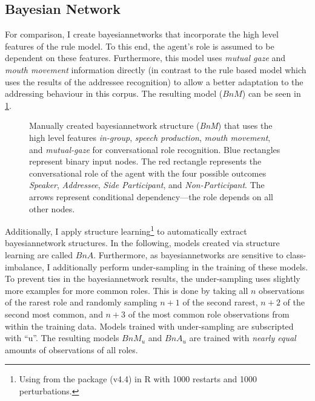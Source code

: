 \subsection{Bayesian Network}\label{sec:role-rule-bn}

For comparison, I create \glspl{bayesiannetwork} that incorporate the high level features of the rule model.
To this end, the agent's role is assumed to be dependent on these features.
Furthermore, this model uses \emph{mutual gaze} and \emph{mouth movement} information directly (in contrast to the rule based model which uses the results of the \gls{addressee} recognition) to allow a better adaptation to the addressing behaviour in this corpus.
The resulting model (\(BnM\)) can be seen in  \cref{fig:role-bn-structures}.
\begin{figure}[tbh]
    \centering
    \def\svgwidth{0.98\textwidth}
    {\footnotesize
    
    }
    \caption[Bayesian Network for role recognition.]{\label{fig:role-bn-structures} 
    Manually created \Gls{bayesiannetwork} structure (\emph{BnM}) that uses the high level features \emph{in-group}, \emph{speech production}, \emph{mouth movement}, and \emph{mutual-gaze} for \gls{conversational role} recognition.
    Blue rectangles represent binary input nodes.
    The red rectangle represents the \gls{conversational role} of the agent with the four possible outcomes \emph{Speaker}, \emph{Addressee}, \emph{Side Participant}, and \emph{Non-Participant}.
    The arrows represent conditional dependency---the role depends on all other nodes.
    }
\end{figure}
Additionally, I apply structure learning\footnote{Using  from the  package (v4.4) in R\cite{bnlearn} with 1000 restarts and 1000 perturbations.} to automatically extract \gls{bayesiannetwork} structures.
In the following, models created via structure learning are called \(BnA\).
Furthermore, as \glspl{bayesiannetwork} are sensitive to class-imbalance, I additionally perform under-sampling in the training of these models.
To prevent ties in the \gls{bayesiannetwork} results, the under-sampling uses slightly more examples for more common roles.
This is done by taking all \(n\) observations of the rarest role and randomly sampling \(n+1\) of the second rarest, \(n+2\) of the second most common, and \(n+3\) of the most common role observations from within the training data.
Models trained with under-sampling are subscripted with \enquote{u}.
The resulting models \(BnM_u\) and \(BnA_u\) are trained with \emph{nearly equal} amounts of observations of all roles.
